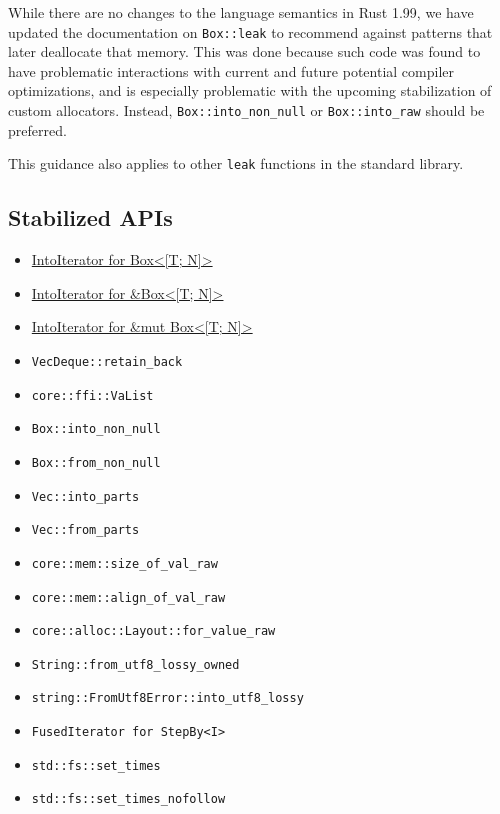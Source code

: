 \documentclass[11pt,a4paper]{article}
\begin{document}
While there are no changes to the language semantics in Rust 1.99, we have updated the documentation on \texttt{Box::leak} to recommend against patterns that later deallocate that memory. This was done because such code was found to have problematic interactions with current and future potential compiler optimizations, and is especially problematic with the upcoming stabilization of custom allocators. Instead, \texttt{Box::into_non_null} or \texttt{Box::into_raw} should be preferred.

This guidance also applies to other \texttt{leak} functions in the standard library.

\subsection{Stabilized APIs}

\begin{itemize}
\item \href{https://doc.rust-lang.org/stable/std/iter/trait.IntoIterator.html\#impl-IntoIterator-for-Box\%3C\%5BT;+N\%5D,+A\%3E}{IntoIterator for Box<[T; N]>}
\item \href{https://doc.rust-lang.org/stable/std/iter/trait.IntoIterator.html\#impl-IntoIterator-for-\%26Box\%3C\%5BT;+N\%5D,+A\%3E}{IntoIterator for \&Box<[T; N]>}
\item \href{https://doc.rust-lang.org/stable/std/iter/trait.IntoIterator.html\#impl-IntoIterator-for-\%26mut+Box\%3C\%5BT;+N\%5D,+A\%3E}{IntoIterator for \&mut Box<[T; N]>}
\item \texttt{VecDeque::retain_back}
\item \texttt{core::ffi::VaList}
\item \texttt{Box::into_non_null}
\item \texttt{Box::from_non_null}
\item \texttt{Vec::into_parts}
\item \texttt{Vec::from_parts}
\item \texttt{core::mem::size_of_val_raw}
\item \texttt{core::mem::align_of_val_raw}
\item \texttt{core::alloc::Layout::for_value_raw}
\item \texttt{String::from_utf8_lossy_owned}
\item \texttt{string::FromUtf8Error::into_utf8_lossy}
\item \texttt{FusedIterator for StepBy<I>}
\item \texttt{std::fs::set_times}
\item \texttt{std::fs::set_times_nofollow}
\end{itemize}
\end{document}
